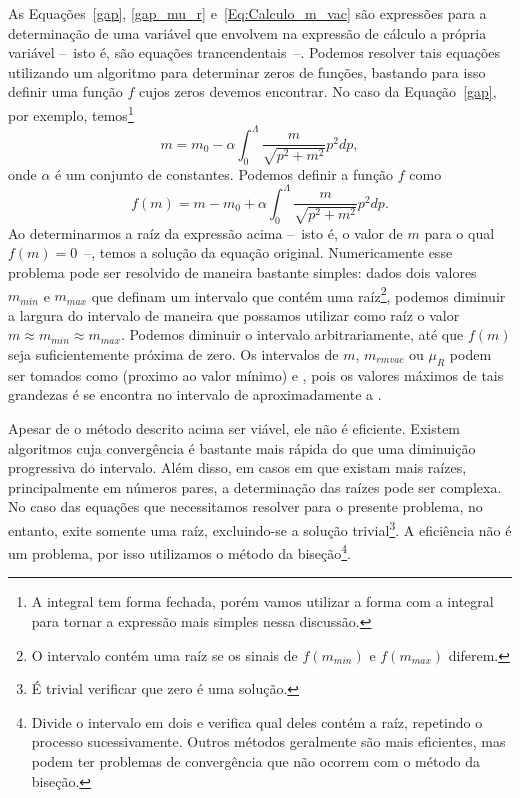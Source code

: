 As Equações~\eqref{gap}, \eqref{gap_mu_r} e~\eqref{Eq:Calculo_m_vac} são expressões para a determinação de uma variável que envolvem na expressão de cálculo a própria variável --~isto é, são equações trancendentais~--. Podemos resolver tais equações utilizando um algoritmo para determinar zeros de funções\cite{NumericalRecipes}, bastando para isso definir uma função $f$ cujos zeros devemos encontrar. No caso da Equação~\eqref{gap}, por exemplo, temos\footnote{A integral tem forma fechada, porém vamos utilizar a forma com a integral para tornar a expressão mais simples nessa discussão.}
\begin{equation}
	m = m_0 - \alpha\int_0^\Lambda \frac{m}{\sqrt{p^2 + m^2}} p^2 dp,
\end{equation}
%
onde $\alpha$ é um conjunto de constantes. Podemos definir a função $f$ como
\begin{equation}
	f(m) = m - m_0 + \alpha\int_0^\Lambda \frac{m}{\sqrt{p^2 + m^2}} p^2 dp.
\end{equation}
%
Ao determinarmos a raíz da expressão acima --~isto é, o valor de $m$ para o qual $f(m) = 0$~--, temos a solução da equação original. Numericamente esse problema pode ser resolvido de maneira bastante simples: dados dois valores $m_{min}$ e $m_{max}$ que definam um intervalo que contém uma raíz\footnote{O intervalo contém uma raíz se os sinais de $f(m_{min})$ e $f(m_{max})$ diferem.}, podemos diminuir a largura do intervalo de maneira que possamos utilizar como raíz o valor $m \approx m_{min} \approx m_{max}$. Podemos diminuir o intervalo arbitrariamente, até que $f(m)$ seja suficientemente próxima de zero. Os intervalos de $m$, $m_{rm{vac}}$ ou $\mu_R$ podem ser tomados como  (proximo ao valor mínimo) e , pois os valores máximos de tais grandezas é se encontra no intervalo de aproximadamente  a .

Apesar de o método descrito acima ser viável, ele não é eficiente. Existem algoritmos cuja convergência é bastante mais rápida do que uma diminuição progressiva do intervalo. Além disso, em casos em que existam mais raízes, principalmente em números pares, a determinação das raízes pode ser complexa. No caso das equações que necessitamos resolver para o presente problema, no entanto, exite somente uma raíz, excluindo-se a solução trivial\footnote{É trivial verificar que zero é uma solução.}. A eficiência não é um problema, por isso utilizamos o método da biseção\footnote{Divide o intervalo em dois e verifica qual deles contém a raíz, repetindo o processo sucessivamente. Outros métodos geralmente são mais eficientes, mas podem ter problemas de convergência que não ocorrem com o método da biseção.}.


